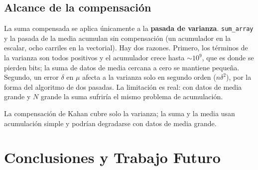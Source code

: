\documentclass[journal]{IEEEtran}
\begin{document}
\subsection{Alcance de la compensación}

La suma compensada se aplica únicamente a la \textbf{pasada de
varianza}. \texttt{sum\_array} y la pasada de la media acumulan sin
compensación (un acumulador en la escalar, ocho carriles en la
vectorial). Hay dos razones. Primero, los términos de la varianza son
todos positivos y el acumulador crece hasta $\sim 10^9$, que es donde
se pierden bits; la suma de datos de media cercana a cero se mantiene
pequeña. Segundo, un error $\delta$ en $\mu$ afecta a la varianza solo
en segundo orden ($n\delta^2$), por la forma del algoritmo de dos
pasadas. La limitación es real: con datos de media grande y $N$
grande la suma sufriría el mismo problema de acumulación.

La compensación de Kahan cubre solo la varianza; la suma y la media
usan acumulación simple y podrían degradarse con datos de media grande.

\section{Conclusiones y Trabajo Futuro}
\label{sec:conclusiones}
\end{document}
